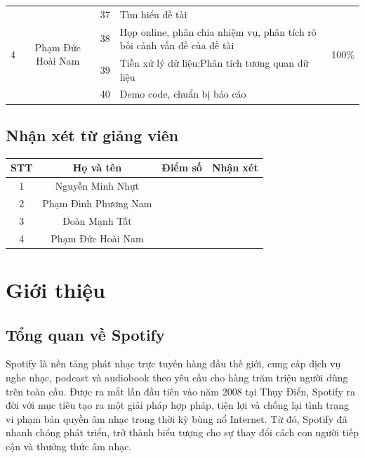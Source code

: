 \documentclass{../hcmut-report}
\begin{document}
\begin{longtable}{|c|c|c|p{5cm}|c|}
\multirow{4}{*}{4} & \multirow{4}{*}{Phạm Đức Hoài Nam} 
    & 37 & Tìm hiểu đề tài & \multirow{4}{*}{100\%} \\ \cline{3-4}
& & 38 & Họp online, phân chia nhiệm vụ, phân tích rõ bối cảnh vấn đề của đề tài & \\ \cline{3-4}
& & 39 & Tiền xử lý dữ liệu;Phân tích tương quan dữ liệu & \\ \cline{3-4}
& & 40 & Demo code, chuẩn bị báo cáo & \\ \hline

\end{longtable}

\subsection*{Nhận xét từ giảng viên}

  \begin{tabular}{|c|c|c|c|}
    \hline
    \textbf{STT} & \textbf{Họ và tên} & \textbf{Điểm số} & \textbf{Nhận xét} \\
    \hline
    1 &  Nguyễn Minh Nhựt   & \hspace{1cm} & \hspace{7.5cm} \\    \hline
    2 & Phạm Đình Phương Nam &  &  \\     \hline
    3 & Đoàn Mạnh Tất  &  &  \\       \hline
    4 & Phạm Đức Hoài Nam  &  &  \\ \hline 

  \end{tabular}



\clearpage
{}
\tableofcontents
\listoffigures
\clearpage
{}
\setcounter{page}{1}

\setcounter{section}{0}

\section{ Giới thiệu}
\subsection{Tổng quan về Spotify }
Spotify là nền tảng phát nhạc trực tuyến hàng đầu thế giới, cung cấp dịch vụ nghe nhạc, podcast và audiobook theo yêu cầu cho hàng trăm triệu người dùng trên toàn cầu. Được ra mắt lần đầu tiên vào năm 2008 tại Thụy Điển, Spotify ra đời với mục tiêu tạo ra một giải pháp hợp pháp, tiện lợi và chống lại tình trạng vi phạm bản quyền âm nhạc trong thời kỳ bùng nổ Internet. Từ đó, Spotify đã nhanh chóng phát triển, trở thành biểu tượng cho sự thay đổi cách con người tiếp cận và thưởng thức âm nhạc.\\
\end{document}
